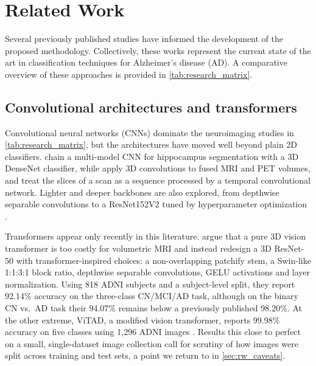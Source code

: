 \section{Related Work}
\label{sec:related_work}

Several previously published studies have informed the development of the proposed
methodology. Collectively, these works represent the current state of the art in
classification techniques for Alzheimer's disease (AD). A comparative overview of
these approaches is provided in \cref{tab:research_matrix}.



\subsection{Convolutional architectures and transformers}
\label{sec:rw_architectures}

Convolutional neural networks (CNNs) dominate the neuroimaging studies in
\cref{tab:research_matrix}, but the architectures have moved well beyond plain
2D classifiers. \textcite{liu2020multimodel} chain a multi-model CNN for hippocampus
segmentation with a 3D DenseNet classifier, while \textcite{kong2022multimodal} apply
3D convolutions to fused MRI and PET volumes, and \textcite{ebrahimi2021deep}
treat the slices of a scan as a sequence processed by a temporal convolutional
network. Lighter and deeper backbones are also explored, from depthwise
separable convolutions \parencite{liu2021alzheimers} to a ResNet152V2 tuned by
hyperparameter optimization \parencite{elmotelb2025novel}.

Transformers appear only recently in this literature. \textcite{zhao2024vision}
argue that a pure 3D vision transformer is too costly for volumetric MRI and
instead redesign a 3D ResNet-50 with transformer-inspired choices: a
non-overlapping patchify stem, a Swin-like 1:1:3:1 block ratio, depthwise
separable convolutions, GELU activations and layer normalization. Using 818
ADNI subjects and a subject-level split, they report 92.14\% accuracy on the
three-class CN/MCI/AD task, although on the binary CN vs.\ AD task their
94.07\% remains below a previously published 98.20\%. At the other extreme, ViTAD, a
modified vision transformer, reports 99.98\%
accuracy on five classes using 1,296 ADNI images \parencite{mahmudjoy2025vitad}.
Results this close to perfect on a small, single-dataset image collection call
for scrutiny of how images were split across training and test sets, a point we
return to in \cref{sec:rw_caveats}.

